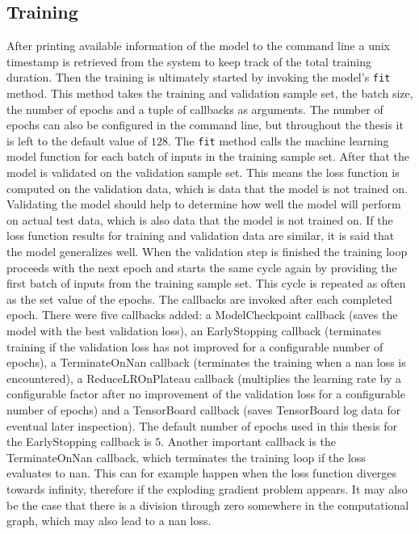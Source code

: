 \documentclass[draft,final]{vutinfth} %
\begin{document}
    \subsection{Training}
    After printing available information of the model to the command line a unix timestamp is retrieved from the system to keep track of the total training duration.
    Then the training is ultimately started by invoking the model's \texttt{fit} method. This method takes the training and validation sample set, the batch size, the number of epochs and a tuple of callbacks as arguments.
    The number of epochs can also be configured in the command line, but throughout the thesis it is left to the default value of $128$.
    The \texttt{fit} method calls the machine learning model function for each batch of inputs in the training sample set. After that the model is validated on the validation sample set.
    This means the loss function is computed on the validation data, which is data that the model is not trained on.
    Validating the model should help to determine how well the model will perform on actual test data, which is also data that the model is not trained on. 
    If the loss function results for training and validation data are similar, it is said that the model generalizes well.
    When the validation step is finished the training loop proceeds with the next epoch and starts the same cycle again by providing the first batch of inputs from the training sample set.
    This cycle is repeated as often as the set value of the epochs.
    The callbacks are invoked after each completed epoch. There were five callbacks added: a ModelCheckpoint callback (saves the model with the best validation loss), an EarlyStopping callback (terminates training if the validation loss has not improved for a configurable number of epochs), a TerminateOnNan callback (terminates the training when a nan loss is encountered), a ReduceLROnPlateau callback (multiplies the learning rate by a configurable factor after no improvement of the validation loss for a configurable number of epochs) and a TensorBoard callback (saves TensorBoard log data for eventual later inspection).
    The default number of epochs used in this thesis for the EarlyStopping callback is $5$.
    Another important callback is the TerminateOnNan callback, which terminates the training loop if the loss evaluates to nan.
    This can for example happen when the loss function diverges towards infinity, therefore if the exploding gradient problem appears. 
    It may also be the case that there is a division through zero somewhere in the computational graph, which may also lead to a nan loss.
\end{document}
